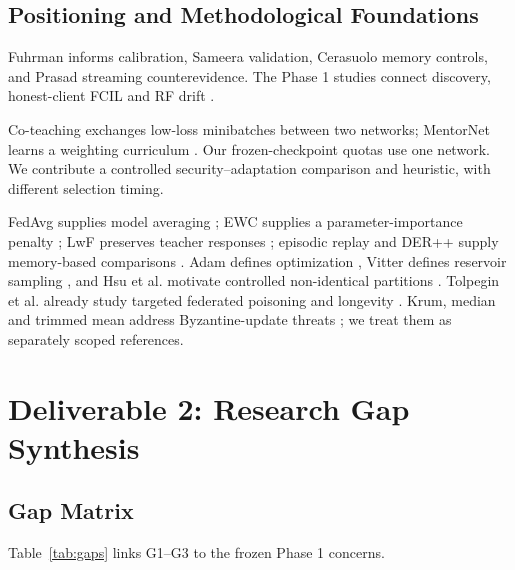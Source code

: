 \documentclass[10pt,a4paper]{article}
\begin{document}
\subsection{Positioning and Methodological Foundations}
Fuhrman informs calibration, Sameera validation, Cerasuolo memory controls, and Prasad streaming counterevidence. The Phase 1 studies connect discovery, honest-client FCIL and RF drift \cite{ge,wu,luo}.

Co-teaching exchanges low-loss minibatches between two networks; MentorNet learns a weighting curriculum \cite{coteach,mentornet}. Our frozen-checkpoint quotas use one network. We contribute a controlled security--adaptation comparison and heuristic, with different selection timing.

FedAvg supplies model averaging \cite{fedavg}; EWC supplies a parameter-importance penalty \cite{ewc}; LwF preserves teacher responses \cite{lwf}; episodic replay and DER++ supply memory-based comparisons \cite{tiny,der}. Adam defines optimization \cite{adam}, Vitter defines reservoir sampling \cite{vitter}, and Hsu et al. motivate controlled non-identical partitions \cite{hsu}. Tolpegin et al. already study targeted federated poisoning and longevity \cite{tolpegin}. Krum, median and trimmed mean address Byzantine-update threats \cite{krum,yin}; we treat them as separately scoped references.

\section{Deliverable 2: Research Gap Synthesis}
\subsection{Gap Matrix}
Table~\ref{tab:gaps} links G1--G3 to the frozen Phase 1 concerns.
\end{document}
